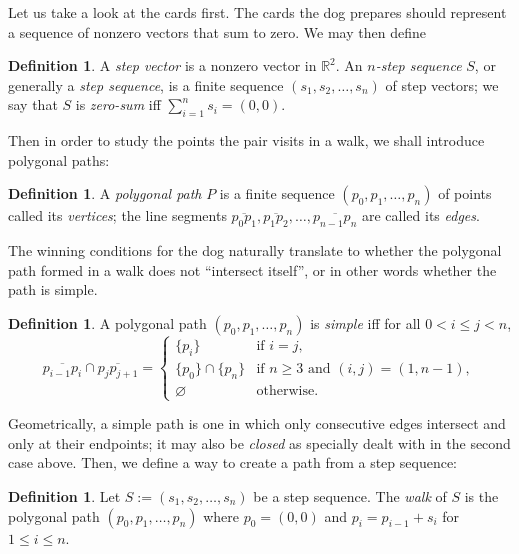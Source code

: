 \documentclass{amsart}
\renewcommand{\emptyset}{\varnothing}
\theoremstyle{definition}
\newtheorem{definition}[proposition]{Definition}
\theoremstyle{problem}
\theoremstyle{remark}
\begin{document}
Let us take a look at the cards first. The cards the dog prepares should represent
a sequence of nonzero vectors that sum to zero. We may then define

\begin{definition}
    A \emph{step vector} is a nonzero vector in $\mathbb{R}^2$.
    An \emph{$n$-step sequence} $S$, or generally a \emph{step sequence},
    is a finite sequence $(s_1,s_2,\dots,s_n)$ of step vectors;
    we say that $S$ is \emph{zero-sum} iff $\sum_{i=1}^{n}s_i=(0,0)$.
\end{definition}

Then in order to study the points the pair visits in a walk, we shall introduce
polygonal paths:

\begin{definition}
    A \emph{polygonal path} $P$ is a finite sequence $(p_0,p_1,\dots,p_n)$
    of points called its \emph{vertices}; the line segments
    $\overline{p_0p_1},\overline{p_1p_2},\dots,\overline{p_{n-1}p_n}$
    are called its \emph{edges}.
\end{definition}

The winning conditions for the dog naturally translate to whether the polygonal
path formed in a walk does not ``intersect itself'', or in other words whether
the path is simple.

\begin{definition}
    A polygonal path $(p_0,p_1,\dots,p_n)$ is \emph{simple}
    iff for all $0<i\le j<n$,
    \[
        \overline{p_{i-1}p_i}\cap\overline{p_jp_{j+1}}=
        \begin{cases}
            \{p_i\}            & \text{if $i=j$},                       \\
            \{p_0\}\cap\{p_n\} & \text{if $n\ge3$ and $(i,j)=(1,n-1)$}, \\
            \emptyset          & \text{otherwise}.
        \end{cases}
    \]
\end{definition}

Geometrically, a simple path is one in which only consecutive
edges intersect and only at their endpoints; it may also
be \emph{closed} as specially dealt with in the second case above.
Then, we define a way to create a path from a step sequence:

\begin{definition}
    Let $S:=(s_1,s_2,\dots,s_n)$ be a step sequence. The \emph{walk} of $S$
    is the polygonal path $(p_0,p_1,\dots,p_n)$
    where $p_0=(0,0)$ and $p_i=p_{i-1}+s_i$ for $1\le i\le n$.
\end{definition}
\end{document}
